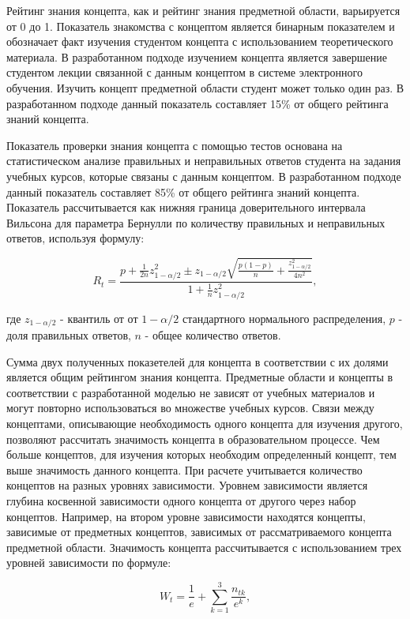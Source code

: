 Рейтинг знания концепта, как и рейтинг знания предметной области, варьируется от 0 до 1. Показатель знакомства с концептом является бинарным показателем и обозначает факт изучения студентом концепта с использованием теоретического материала. В разработанном подходе изучением концепта является завершение студентом лекции связанной с данным концептом в системе электронного обучения. Изучить концепт предметной области студент может только один раз. В разработанном подходе данный показатель составляет 15\% от общего рейтинга знаний концепта.

Показатель проверки знания концепта с помощью тестов основана на статистическом анализе правильных и неправильных ответов студента на задания учебных курсов, которые связаны с данным концептом. В разработанном подходе данный показатель составляет 85\% от общего рейтинга знаний концепта. Показатель рассчитывается как нижняя граница доверительного интервала Вильсона для параметра Бернулли по количеству правильных и неправильных ответов, используя формулу:

$$
    R_t = \frac{p+\frac{1}{2n}z_{1-\alpha/2}^2 \pm z_{1-\alpha/2}\sqrt{\frac{p(1-p)}{n}+\frac{z_{1-\alpha/2}^2}{4n^2}}{} }{1+\frac{1}{n}z_{1-\alpha/2}^2},
$$

где \(z_{1-\alpha/2}\) - квантиль от от \(1-\alpha/2\) стандартного нормального распределения, \(p\) - доля правильных ответов, \(n\) - общее количество ответов. 

Сумма двух полученных показетелей для концепта в соответствии с их долями является общим рейтингом знания концепта. Предметные области и концепты в соответствии с разработанной моделью не зависят от учебных материалов и могут повторно использоваться во множестве учебных курсов. Связи между концептами, описывающие необходимость одного концепта для изучения другого, позволяют рассчитать значимость концепта в образовательном процессе. Чем больше концептов, для изучения которых необходим определенный концепт, тем выше значимость данного концепта. При расчете учитывается количество концептов на разных уровнях зависимости. Уровнем зависимости является глубина косвенной зависимости одного концепта от другого через набор концептов. Например, на втором уровне зависимости находятся концепты, зависимые от предметных концептов, зависимых от рассматриваемого концепта предметной области. Значимость концепта рассчитывается с использованием трех уровней зависимости по формуле: 

$$
    W_t = \frac{1}{e}+\sum_{k=1}^{3}\frac{n_{tk}}{e^k}, 
$$

